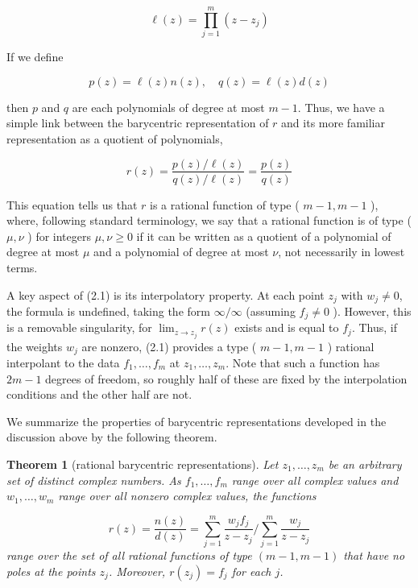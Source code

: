 \documentclass[11pt]{article}
\newtheorem{theorem}{Theorem}[section]
\theoremstyle{definition}
\begin{document}
    
    \begin{equation*}
    \ell(z)=\prod_{j=1}^{m}\left(z-z_{j}\right) \tag{2.2}
    \end{equation*}
    
    
    If we define
    
    
    \begin{equation*}
    p(z)=\ell(z) n(z), \quad q(z)=\ell(z) d(z) \tag{2.3}
    \end{equation*}
    
    
    then $p$ and $q$ are each polynomials of degree at most $m-1$. Thus, we have a simple link between the barycentric representation of $r$ and its more familiar representation as a quotient of polynomials,
    
    
    \begin{equation*}
    r(z)=\frac{p(z) / \ell(z)}{q(z) / \ell(z)}=\frac{p(z)}{q(z)} \tag{2.4}
    \end{equation*}
    
    
    This equation tells us that $r$ is a rational function of type ( $m-1, m-1$ ), where, following standard terminology, we say that a rational function is of type ( $\mu, \nu$ ) for integers $\mu, \nu \geq 0$ if it can be written as a quotient of a polynomial of degree at most $\mu$ and a polynomial of degree at most $\nu$, not necessarily in lowest terms. 
    
    A key aspect of (2.1) is its interpolatory property. At each point $z_{j}$ with $w_{j} \neq 0$, the formula is undefined, taking the form $\infty / \infty$ (assuming $f_{j} \neq 0$ ). However, this is a removable singularity, for $\lim _{z \rightarrow z_{j}} r(z)$ exists and is equal to $f_{j}$. Thus, if the weights $w_{j}$ are nonzero, (2.1) provides a type ( $m-1, m-1$ ) rational interpolant to the data $f_{1}, \ldots, f_{m}$ at $z_{1}, \ldots, z_{m}$. Note that such a function has $2 m-1$ degrees of freedom, so roughly half of these are fixed by the interpolation conditions and the other half are not.
    
    We summarize the properties of barycentric representations developed in the discussion above by the following theorem.
    
    \begin{theorem}[rational barycentric representations]
        Let $z_{1}, \ldots, z_{m}$ be an arbitrary set of distinct complex numbers. As $f_{1}, \ldots, f_{m}$ range over all complex values and $w_{1}, \ldots, w_{m}$ range over all nonzero complex values, the functions
    

    \begin{equation*}
    r(z)=\frac{n(z)}{d(z)}=\sum_{j=1}^{m} \frac{w_{j} f_{j}}{z-z_{j}} / \sum_{j=1}^{m} \frac{w_{j}}{z-z_{j}} \tag{2.5}
    \end{equation*}
    range over the set of all rational functions of type $(m-1, m-1)$  that have no poles at the points $z_{j}$. Moreover, $r\left(z_{j}\right)=f_{j}$ for each $j$.
    \end{theorem}
    
\end{document}
